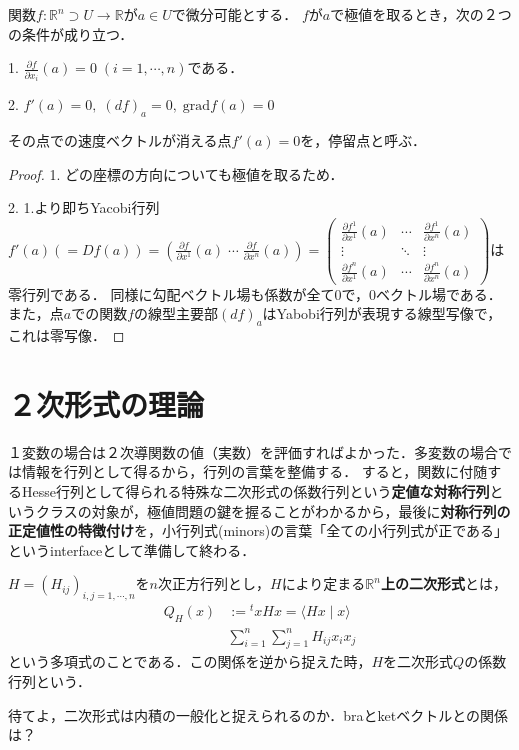 \documentclass[uplatex, dvipdfmx]{jsreport}
\begin{document}
\begin{proposition}
    関数$f:\mathbb{R}^n\supset U\to\mathbb{R}$が$a\in U$で微分可能とする．
    $f$が$a$で極値を取るとき，次の２つの条件が成り立つ．
    
    1. $\frac{\partial f}{\partial x_i}(a)=0\; (i=1,\cdots, n)$である．

    2. $f'(a)=0,\; (df)_a=0,\; \mathrm{grad}f(a)=0$

    その点での速度ベクトルが消える点$f'(a)=0$を，停留点と呼ぶ．
\end{proposition}
\begin{proof}
    1. どの座標の方向についても極値を取るため．

    2. 1.より即ちYacobi行列$f'(a)(=Df(a))=\left(\frac{\partial f}{\partial x^1}(a)\;\cdots\;\frac{\partial f}{\partial x^n}(a)\right)=\begin{pmatrix}\frac{\partial f^1}{\partial x^1}(a)&\cdots&\frac{\partial f^1}{\partial x^n}(a)\\\vdots&\ddots&\vdots\\\frac{\partial f^n}{\partial x^1}(a)&\cdots&\frac{\partial f^n}{\partial x^n}(a)\end{pmatrix}$は零行列である．
    同様に勾配ベクトル場も係数が全て$0$で，$0$ベクトル場である．
    また，点$a$での関数$f$の線型主要部$(df)_a$はYabobi行列が表現する線型写像で，これは零写像．
\end{proof}

\section{２次形式の理論}
１変数の場合は２次導関数の値（実数）を評価すればよかった．多変数の場合では情報を行列として得るから，行列の言葉を整備する．
すると，関数に付随するHesse行列として得られる特殊な二次形式の係数行列という\textbf{定値な対称行列}というクラスの対象が，極値問題の鍵を握ることがわかるから，最後に\textbf{対称行列の正定値性の特徴付け}を，小行列式(minors)の言葉「全ての小行列式が正である」というinterfaceとして準備して終わる．

\begin{definition}[二次形式と係数行列]
    $H=(H_{ij})_{i,j=1,\cdots,n}$を$n$次正方行列とし，$H$により定まる\textbf{$\mathbb{R}^n$上の二次形式}とは，
    \begin{align*}
        Q_H(x)&:={}^txHx=\langle Hx\mid x\rangle\\
        &\sum^n_{i=1}\sum^n_{j=1}H_{ij}x_ix_j
    \end{align*}
    という多項式のことである．この関係を逆から捉えた時，$H$を二次形式$Q$の係数行列という．
\end{definition}
\begin{remark}
    待てよ，二次形式は内積の一般化と捉えられるのか．braとketベクトルとの関係は？
\end{remark}
\end{document}
